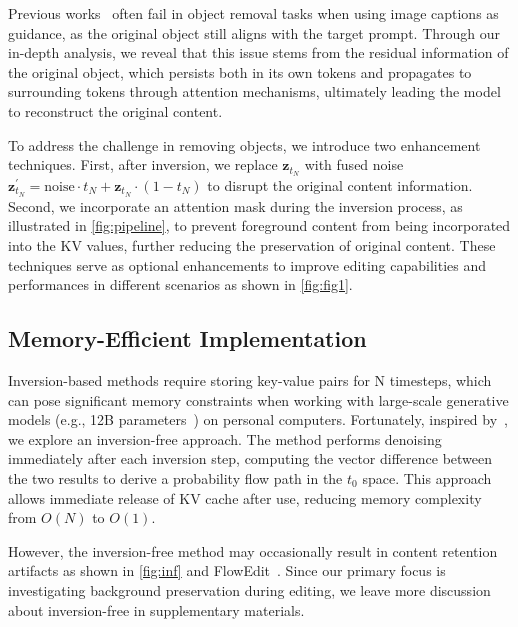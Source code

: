 Previous works~\cite{hertz2022prompt,dong2023prompt,cao2023masactrl} often fail in object removal tasks when using image captions as guidance, as the original object still aligns with the target prompt. Through our in-depth analysis, we reveal that this issue stems from the residual information of the original object, which persists both in its own tokens and propagates to surrounding tokens through attention mechanisms, ultimately leading the model to reconstruct the original content.

To address the challenge in removing objects, we introduce two enhancement techniques. First, after inversion, we replace $\mathbf{z}_{t_N}$ with fused noise $\mathbf{z}^{\prime}_{t_N} = \mathrm{noise} \cdot t_N + \mathbf{z}_{t_N}\cdot(1-t_N)$ to disrupt the original content information. Second, we incorporate an attention mask during the inversion process, as illustrated in \cref{fig:pipeline}, to prevent foreground content from being incorporated into the KV values, further reducing the preservation of original content. These techniques serve as optional enhancements to improve editing capabilities and performances in different scenarios as shown in \cref{fig:fig1}.




\subsection{Memory-Efficient Implementation}
Inversion-based methods require storing key-value pairs for N timesteps, which can pose significant memory constraints when working with large-scale generative models (e.g., 12B parameters~\cite{flux}) on personal computers. Fortunately, inspired by~\cite{xu2024inversion,kulikov2024flowedit}, we explore an inversion-free approach. The method performs denoising immediately after each inversion step, computing the vector difference between the two results to derive a probability flow path in the $t_0$ space. This approach allows immediate release of KV cache after use, reducing memory complexity from $O(N)$ to $O(1)$.

However, the inversion-free method may occasionally result in content retention artifacts as shown in \cref{fig:inf} and FlowEdit~\cite{kulikov2024flowedit}. Since our primary focus is investigating background preservation during editing, we leave more discussion about inversion-free in supplementary materials.
